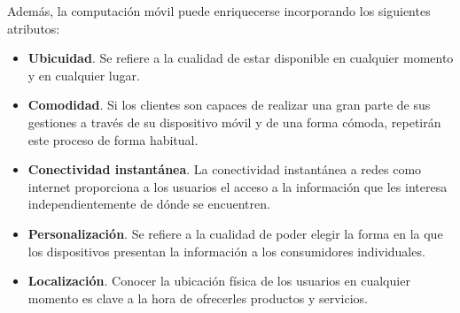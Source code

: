 Además, la computación móvil puede enriquecerse incorporando los siguientes
atributos:
\begin{itemize}
\item \textbf{Ubicuidad}. Se refiere a la cualidad de estar disponible en
cualquier momento y en cualquier lugar.
\item \textbf{Comodidad}. Si los clientes son capaces de realizar una gran
parte de sus gestiones a través de su dispositivo móvil y de una forma cómoda,
repetirán este proceso de forma habitual.
\item \textbf{Conectividad instantánea}. La conectividad instantánea a redes
como internet proporciona a los usuarios el acceso a la información que les
interesa independientemente de dónde se encuentren.
\item \textbf{Personalización}. Se refiere a la cualidad de poder elegir
la forma en la que los dispositivos presentan la información a los consumidores
individuales.
\item \textbf{Localización}. Conocer la ubicación física de los usuarios en
cualquier momento es clave a la hora de ofrecerles productos y servicios.
\end{itemize}

